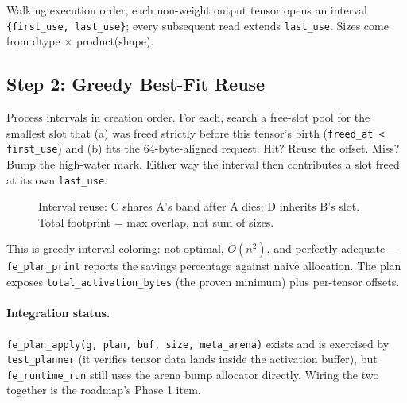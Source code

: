 \documentclass[11pt,a4paper]{article}
\begin{document}
Walking execution order, each non-weight output tensor opens an interval
\texttt{\{first\_use, last\_use\}}; every subsequent read extends
\texttt{last\_use}. Sizes come from dtype $\times$ product(shape).

\subsection{Step 2: Greedy Best-Fit Reuse}

Process intervals in creation order. For each, search a free-slot pool for the
smallest slot that (a) was freed strictly before this tensor's birth
(\texttt{freed\_at < first\_use}) and (b) fits the 64-byte-aligned request. Hit?
Reuse the offset. Miss? Bump the high-water mark. Either way the interval then
contributes a slot freed at its own \texttt{last\_use}.

\begin{figure}[h]
\centering
{}
\caption{Interval reuse: C shares A's band after A dies; D inherits B's slot.
Total footprint = max overlap, not sum of sizes.}
\label{fig:plan}
\end{figure}

This is greedy interval coloring: not optimal, $O(n^2)$, and perfectly adequate
--- \texttt{fe\_plan\_print} reports the savings percentage against naive
allocation. The plan exposes \texttt{total\_activation\_bytes} (the proven
minimum) plus per-tensor offsets.

\paragraph{Integration status.} \texttt{fe\_plan\_apply(g, plan, buf, size,
meta\_arena)} exists and is exercised by \texttt{test\_planner} (it verifies
tensor data lands inside the activation buffer), but \texttt{fe\_runtime\_run}
still uses the arena bump allocator directly. Wiring the two together is the
roadmap's Phase 1 item.
\end{document}
